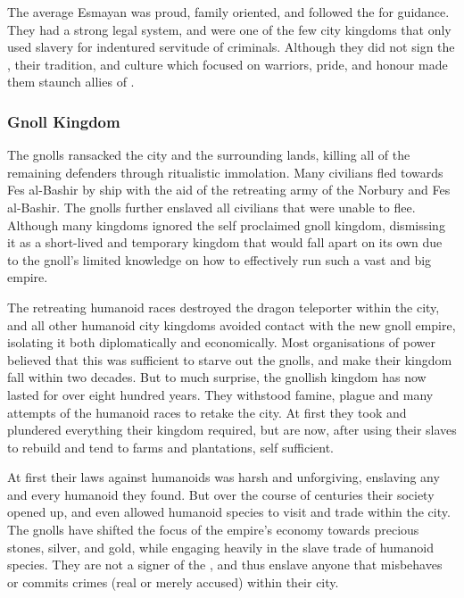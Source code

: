 The average Esmayan was proud, family oriented, and followed the
 for guidance. They had a strong legal system, and were one
of the few city kingdoms that only used slavery for indentured servitude of
criminals. Although they did not sign the , their
tradition, and culture which focused on warriors, pride, and honour made them
staunch allies of .

\subsubsection{Gnoll Kingdom}

The gnolls ransacked the city and the surrounding lands, killing all of the
remaining defenders through ritualistic immolation. Many civilians fled
towards Fes al-Bashir by ship with the aid of the retreating army of the
Norbury and Fes al-Bashir. The gnolls further enslaved all civilians that were
unable to flee. Although many kingdoms ignored the self proclaimed gnoll
kingdom, dismissing it as a short-lived and temporary kingdom that would fall
apart on its own due to the gnoll's limited knowledge on how to effectively
run such a vast and big empire.

The retreating humanoid races destroyed the dragon teleporter within the city,
and all other humanoid city kingdoms avoided contact with the new gnoll
empire, isolating it both diplomatically and economically. Most organisations
of power believed that this was sufficient to starve out the gnolls, and make
their kingdom fall within two decades. But to much surprise, the gnollish
kingdom has now lasted for over eight hundred years. They withstood famine,
plague and many attempts of the humanoid races to retake the city. At first
they took and plundered everything their kingdom required, but are now, after
using their slaves to rebuild and tend to farms and plantations, self
sufficient.

At first their laws against humanoids was harsh and unforgiving, enslaving any
and every humanoid they found. But over the course of centuries their society
opened up, and even allowed humanoid species to visit and trade within the
city. The gnolls have shifted the focus of the empire's economy towards
precious stones, silver, and gold, while engaging heavily in the slave trade
of humanoid species. They are not a signer of the ,
and thus enslave anyone that misbehaves or commits crimes (real or merely
accused) within their city.

